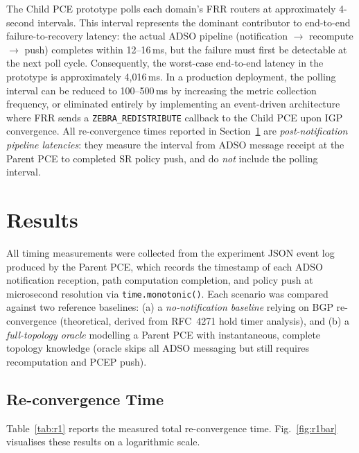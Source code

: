 \documentclass[conference]{IEEEtran}
\begin{document}
The Child PCE prototype polls each domain's FRR routers at
approximately 4-second intervals. This interval represents the
dominant contributor to end-to-end failure-to-recovery latency:
the actual ADSO pipeline (notification $\to$ recompute $\to$ push)
completes within 12--16\,ms, but the failure must first be detectable
at the next poll cycle. Consequently, the worst-case end-to-end
latency in the prototype is approximately 4{,}016\,ms. In a production
deployment, the polling interval can be reduced to 100--500\,ms by
increasing the metric collection frequency, or eliminated entirely by
implementing an event-driven architecture where FRR sends a
\texttt{ZEBRA\_REDISTRIBUTE} callback to the Child PCE upon IGP
convergence. All re-convergence times reported in Section~\ref{sec:results}
are \emph{post-notification pipeline latencies}: they measure the
interval from ADSO message receipt at the Parent PCE to completed SR
policy push, and do \emph{not} include the polling interval.

\section{Results}
\label{sec:results}

All timing measurements were collected from the experiment JSON event
log produced by the Parent PCE, which records the timestamp of each
ADSO notification reception, path computation completion, and policy
push at microsecond resolution via \texttt{time.monotonic()}. Each
scenario was compared against two reference baselines: (a) a
\emph{no-notification baseline} relying on BGP re-convergence
(theoretical, derived from RFC~4271 \cite{b_rfc4271} hold timer
analysis), and (b) a \emph{full-topology oracle} modelling a Parent
PCE with instantaneous, complete topology knowledge (oracle skips all
ADSO messaging but still requires recomputation and PCEP push).

\subsection{Re-convergence Time}

Table~\ref{tab:r1} reports the measured total re-convergence time.
Fig.~\ref{fig:r1bar} visualises these results on a logarithmic scale.
\end{document}
